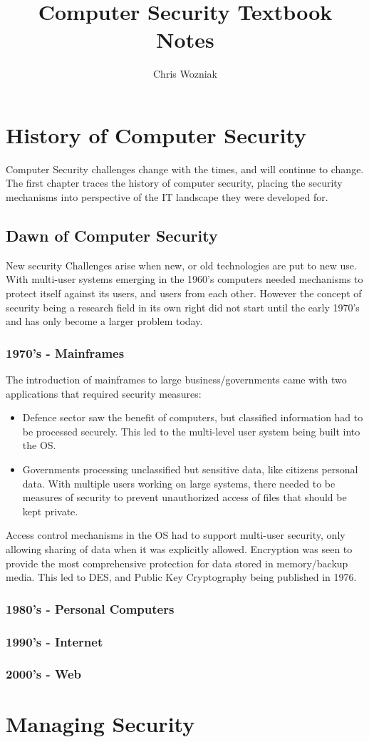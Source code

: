 \documentclass{report}
\title{Computer Security Textbook Notes}
\author{Chris Wozniak}
\theoremstyle{definition}
\begin{document}
\maketitle
\tableofcontents
\chapter{History of Computer Security}
	Computer Security challenges change with the times, and will continue to change. The first chapter traces the history of 
	computer security, placing the security mechanisms into perspective of the IT landscape they were developed for.
	\section{Dawn of Computer Security}
		New security Challenges arise when new, or old technologies are put to new use. With multi-user systems emerging in
		the 1960's computers needed mechanisms to protect itself against its users, and users from each other. However the
		concept of security being a research field in its own right did not start until the early 1970's and has only become a 
		larger problem today.
		\subsection{1970's - Mainframes}
			The introduction of mainframes to large business/governments came with two applications that required security
			measures:
			\begin{itemize}
				\item Defence sector saw the benefit of computers, but classified information had to be processed securely.
					This led to the multi-level user system being built into the OS.
				\item Governments processing unclassified but sensitive data, like citizens personal data. With multiple users
					working on large systems, there needed to be measures of security to prevent unauthorized access of
					files that should be kept private.
			\end{itemize}
			Access control mechanisms in the OS had to support multi-user security, only allowing sharing of data when it was 
			explicitly allowed. Encryption was seen to provide the most comprehensive protection for data stored in 
			memory/backup media. This led to DES, and Public Key Cryptography being published in 1976.

		\subsection{1980's - Personal Computers}
		\subsection{1990's - Internet}
		\subsection{2000's - Web}

\chapter {Managing Security}
	
\end{document}
